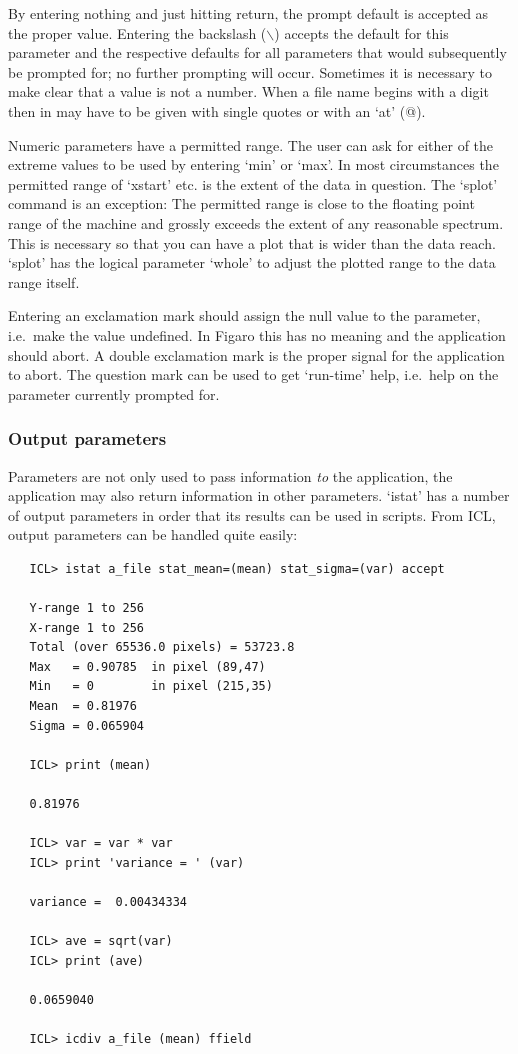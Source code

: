 \documentclass[11pt,twoside]{article}
\newcommand{\htmlref}[2]{#1}
\begin{document}
   By entering nothing and just hitting return, the prompt default is
   accepted as the proper value. Entering the backslash ($\backslash$)
   accepts the default for this parameter and the respective defaults
   for all parameters that would subsequently be prompted for; no
   further prompting will occur. Sometimes it is necessary to make clear
   that a value is not a number. When a file name begins with a digit
   then in may have to be given with single quotes or with an `at' (@).

   Numeric parameters have a permitted range. The user can ask for
   either of the extreme values to be used by entering `min' or
   `max'. In most circumstances the permitted range of `xstart' etc. is
   the extent of the data in question. The `splot' command is an
   exception: The permitted range is close to the floating point range
   of the machine and grossly exceeds the extent of any reasonable
   spectrum. This is necessary so that you can have a plot that is wider
   than the data reach. `splot' has the logical parameter `whole' to
   adjust the plotted range to the data range itself.

   Entering an exclamation mark should assign the null value to the
   parameter, i.e.\ make the value undefined. In Figaro this has no
   meaning and the application should abort. A double exclamation mark
   is the proper signal for the application to abort. The question mark
   can be used to get
\htmlref{`run-time' help,}{gethelp}
   i.e.\ help on the parameter currently prompted for.


\subsubsection{\label{paramsoutput}Output parameters}

   Parameters are not only used to pass information {\em to\/}
   the application, the application may also return information in other
   parameters. `istat' has a number of output parameters in order that
   its results can be used in scripts. From ICL, output parameters can be
   handled quite easily:

\begin{verbatim}
   ICL> istat a_file stat_mean=(mean) stat_sigma=(var) accept

   Y-range 1 to 256
   X-range 1 to 256
   Total (over 65536.0 pixels) = 53723.8
   Max   = 0.90785  in pixel (89,47)
   Min   = 0        in pixel (215,35)
   Mean  = 0.81976
   Sigma = 0.065904

   ICL> print (mean)

   0.81976

   ICL> var = var * var
   ICL> print 'variance = ' (var)

   variance =  0.00434334

   ICL> ave = sqrt(var)
   ICL> print (ave)

   0.0659040

   ICL> icdiv a_file (mean) ffield
\end{verbatim}
\end{document}
